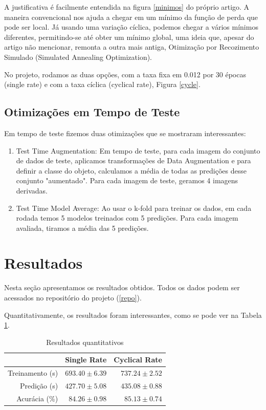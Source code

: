 \documentclass[conference]{IEEEtran}
\begin{document}
A justificativa é facilmente entendida na figura \ref{minimos} do próprio artigo.  A maneira convencional nos ajuda a chegar em um mínimo da função de perda que pode ser local. Já usando uma variação cíclica, podemos chegar a vários mínimos diferentes, permitindo-se até obter um mínimo global, uma ideia que, apesar do artigo não mencionar, remonta a outra mais antiga, Otimização por Recozimento Simulado (Simulated Annealing Optimization)\cite{annealing}.

No projeto, rodamos as duas opções, com a taxa fixa em 0.012 por 30 épocas (single rate) e com a taxa cíclica (cyclical rate), Figura \ref{cycle}.


\subsection{Otimizações em Tempo de Teste}

Em tempo de teste fizemos duas otimizações que se mostraram interessantes:
\begin{enumerate}
\item Test Time Augmentation: Em tempo de teste, para cada imagem do conjunto de dados de teste, aplicamos transformações de Data Augmentation e para definir a classe do objeto, calculamos a média de todas as predições desse conjunto "aumentado".  Para cada imagem de teste, geramos 4 imagens derivadas.
\item Test Time Model Average: Ao usar o k-fold para treinar os dados, em cada rodada temos 5 modelos treinados com 5 predições. Para cada imagem avaliada, tiramos a média das 5 predições.
\end{enumerate}


\section{Resultados}
Nesta seção apresentamos os resultados obtidos. Todos os dados podem ser acessados no repositório do projeto (\ref{repo}).

Quantitativamente, os resultados foram interessantes, como se pode ver na Tabela \ref{tabela}.
\begin{table}[]
\centering
\caption{Resultados quantitativos}
\label{tabela}
\begin{tabular}{@{}rrr@{}}
\toprule
            & \multicolumn{1}{c}{Single Rate} & \multicolumn{1}{c}{Cyclical Rate} \\ \midrule
Treinamento (s) & \(693.40\pm6.39\)& \(737.24\pm2.52\)                                  \\ \midrule
Predição (s)    & \(427.70\pm5.08\)&  \(435.08\pm0.88\)                                \\ \midrule
Acurácia  (\%)  & \(84.26\pm0.98\)  & \(85.13\pm0.74\)                              \\ \bottomrule
\end{tabular}
\end{table}
\end{document}
